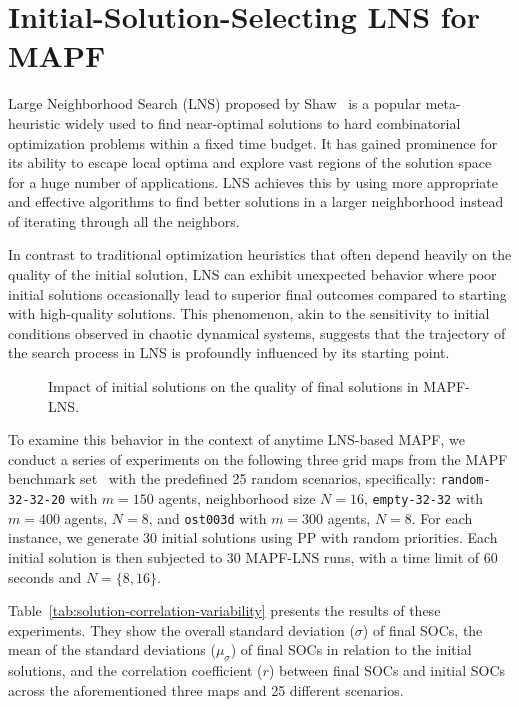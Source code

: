 \documentclass[runningheads]{llncs}
\begin{document}
\section{Initial-Solution-Selecting LNS for MAPF} \label{sec:iss-mapf-lns}

Large Neighborhood Search (LNS) proposed by Shaw~\cite{shaw-1998} is a popular meta-heuristic widely used to find near-optimal solutions to hard combinatorial optimization problems within a fixed time budget. It has gained prominence for its ability to escape local optima and explore vast regions of the solution space for a huge number of applications. LNS achieves this by using more appropriate and effective algorithms to find better solutions in a larger neighborhood instead of iterating through all the neighbors.

In contrast to traditional optimization heuristics that often depend heavily on the quality of the initial solution, LNS can exhibit unexpected behavior where poor initial solutions occasionally lead to superior final outcomes compared to starting with high-quality solutions. This phenomenon, akin to the sensitivity to initial conditions observed in chaotic dynamical systems, suggests that the trajectory of the search process in LNS is profoundly influenced by its starting point.

\begin{figure}[!t]
    \centering
    \resizebox{1\textwidth}{!}{}
    \caption{Impact of initial solutions on the quality of final solutions in MAPF-LNS.}
    \label{fig:boxplotsMAPFSolutionDependency}
\end{figure}

To examine this behavior in the context of anytime LNS-based MAPF, we conduct a series of experiments on the following three grid maps from the MAPF benchmark set~\cite{stern-2019} with the predefined 25 random scenarios, specifically: \texttt{random-32-32-20} with $m=150$ agents, neighborhood size $N=16$, \texttt{empty-32-32} with $m=400$ agents, $N=8$, and \texttt{ost003d} with $m=300$ agents, $N=8$. For each instance, we generate 30 initial solutions using PP with random priorities. Each initial solution is then subjected to 30 MAPF-LNS runs, with a time limit of 60 seconds and $N=\{8,16\}$. 

Table~\ref{tab:solution-correlation-variability} presents the results of these experiments. They show the overall standard deviation ($\sigma$) of final SOCs, the mean of the standard deviations ($\mu_\sigma$) of final SOCs in relation to the initial solutions, and the correlation coefficient ($r$) between final SOCs and initial SOCs across the aforementioned three maps and 25 different scenarios.
\end{document}
